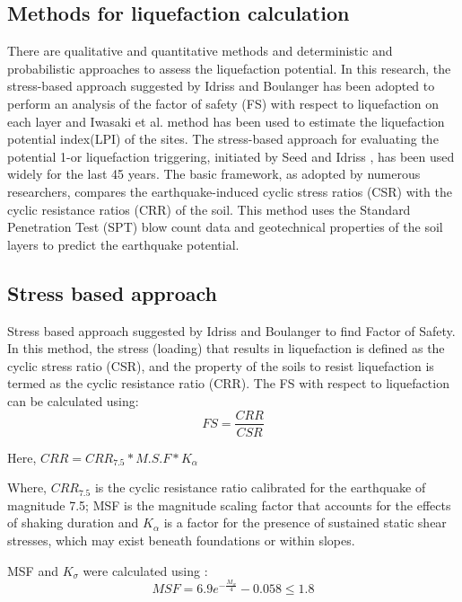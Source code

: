 \subsection{Methods for liquefaction calculation}
There are qualitative and quantitative methods and deterministic and probabilistic approaches to assess the liquefaction potential. In this research, the stress-based approach suggested by Idriss and Boulanger\cite{idris_and_bolinger} has been adopted to perform an analysis of the factor of safety (FS) with respect to liquefaction on each layer and Iwasaki et al. \cite{r26} method has been used to estimate the liquefaction potential index(LPI) of the sites.
The stress-based approach for evaluating the potential 1-or liquefaction triggering, initiated by Seed and Idriss \cite{idris_seed}, has been used widely for the last 45 years. The basic framework, as adopted by numerous researchers, compares the earthquake-induced cyclic stress ratios (CSR) with the cyclic resistance ratios (CRR) of the soil. This method uses the Standard Penetration Test (SPT) blow count data and geotechnical properties of the soil layers to predict the earthquake potential.
\subsection{Stress based approach}
Stress based approach suggested by Idriss and Boulanger \cite{idris_and_bolinger} to find Factor of Safety. In this method, the stress (loading) that results in liquefaction is defined as the cyclic stress ratio (CSR), and the property of the soils to resist liquefaction is termed as the cyclic resistance ratio (CRR). The FS with respect to liquefaction can be calculated using:
\begin{equation}
FS = \frac{CRR}{CSR}
\end{equation}

Here, $CRR = CRR_{7.5}*M.S.F*K_\alpha $

Where, $CRR_{7.5}$ is the cyclic resistance ratio calibrated for the earthquake of magnitude 7.5; MSF is the magnitude scaling factor that accounts for the effects of shaking duration and $K_\alpha$ is a factor for the presence of sustained static shear stresses, which may exist beneath foundations or within slopes.

MSF and $K_\sigma$ were calculated using \cite{idris_and_bolinger}: 
\begin{equation}
MSF = 6.9 e^{- \frac{M_w}{4}} - 0.058 \leq 1.8
\end{equation}


